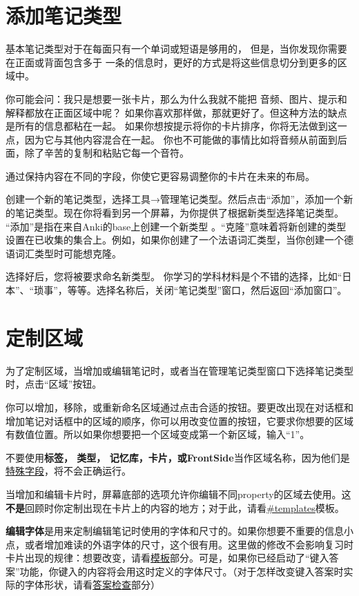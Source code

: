 \documentclass[a4paper]{book}
\begin{document}
	\section{添加笔记类型}
	
	基本笔记类型对于在每面只有一个单词或短语是够用的， 但是，当你发现你需要在正面或背面包含多于 一条的信息时，更好的方式是将这些信息切分到更多的区域中。
	
	你可能会问：我只是想要一张卡片，那么为什么我就不能把 音频、图片、提示和解释都放在正面区域中呢？ 如果你喜欢那样做，那就更好了。但这种方法的缺点是所有的信息都粘在一起。 如果你想按提示将你的卡片排序，你将无法做到这一点，因为它与其他内容混合在一起。 你也不可能做的事情比如将音频从前面到后面，除了辛苦的复制和粘贴它每一个音符。
	
	通过保持内容在不同的字段，你使它更容易调整你的卡片在未来的布局。
	
	创建一个新的笔记类型，选择工具→管理笔记类型。然后点击“添加”，添加一个新的笔记类型。现在你将看到另一个屏幕，为你提供了根据新类型选择笔记类型。 “添加”是指在来自Anki的base上创建一个新类型 。“克隆”意味着将新创建的类型设置在已收集的集合上。例如，如果你创建了一个法语词汇类型，当你创建一个德语词汇类型时可能想克隆。
	
	选择好后，您将被要求命名新类型。 你学习的学科材料是个不错的选择，比如“日本”、“琐事”，等等。选择名称后，关闭“笔记类型”窗口，然后返回“添加窗口”。
	
	\section{定制区域}\label{fields}
	
	为了定制区域，当增加或编辑笔记时，或者当在管理笔记类型窗口下选择笔记类型时，点击“区域”按钮。
	
	你可以增加，移除，或重新命名区域通过点击合适的按钮。要更改出现在对话框和增加笔记对话框中的区域的顺序，你可以用改变位置的按钮，它要求你想要的区域有数值位置。所以如果你想要把一个区域变成第一个新区域，输入“1”。
	
	
	\begin{shaded}
		不要使用\textbf{标签， 类型， 记忆库，卡片，或FrontSide}当作区域名称，因为他们是\hyperref[specialfields]{特殊字段}，将不会正确运行。
	\end{shaded}
	
	当增加和编辑卡片时，屏幕底部的选项允许你编辑不同property的区域去使用。这\textbf{不是}回顾时你定制出现在卡片上的内容的地方；对于此，请看\url{#templates}模板。
	
	\textbf{编辑字体}是用来定制编辑笔记时使用的字体和尺寸的。如果你想要不重要的信息小点，或者增加难读的外语字体的尺寸，这个很有用。这里做的修改不会影响复习时卡片出现的规律：想要改变，请看\hyperref[template]{模板}部分。可是，如果你已经启动了“键入答案”功能，你键入的内容将会用这时定义的字体尺寸。（对于怎样改变键入答案时实际的字体形状，请看\hyperref[typinganswers]{答案检查}部分）
	
\end{document}
